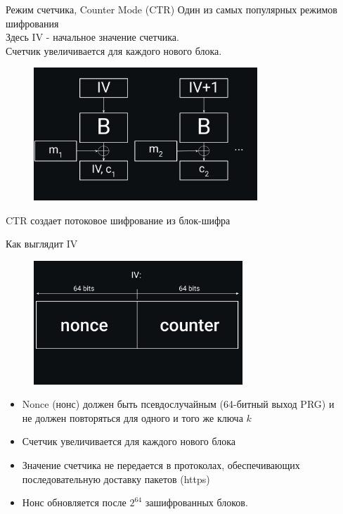 \documentclass[usenames,dvipsnames,8pt,aspectratio=169]{beamer}
\begin{document}
\begin{frame}{Режим счетчика, Counter Mode (CTR)}
\Large
Один из самых популярных режимов шифрования \\
Здесь IV - начальное значение счетчика. \\
Счетчик увеличивается для каждого нового блока. \\
\begin{figure}
	\includegraphics[width=0.75\textwidth]{CTR}
\end{figure}
\vspace{-20pt}
CTR создает потоковое шифрование из блок-шифра \\

\end{frame}

\begin{frame}{Как выглядит IV}
	\begin{figure}
		\includegraphics[width=0.70\textwidth]{ShapeOfIV}
	\end{figure}
\vspace*{-50pt}
\large
\begin{itemize}
\item Nonce (нонс) должен быть псевдослучайным (64-битный выход PRG) и \\ не должен повторяться для одного и того же ключа $k$\\
\item Счетчик увеличивается для каждого нового блока
\item Значение счетчика не передается в протоколах, обеспечивающих \\ последовательную доставку пакетов (https)
\item Нонс обновляется после $2^{64}$ зашифрованных блоков.

\end{itemize}
\end{frame}
\end{document}
